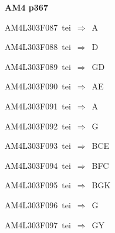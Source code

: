\par\vfill\eject
{\bf\hfill AM4 p367\hfill\hbox{}}\par\bigskip
{\sixrm AM4L303F087\ {\sixit tei}\ }$\Rightarrow$\ A\par\smallskip
{\sixrm AM4L303F088\ {\sixit tei}\ }$\Rightarrow$\ D\par\smallskip
{\sixrm AM4L303F089\ {\sixit tei}\ }$\Rightarrow$\ GD\par\smallskip
{\sixrm AM4L303F090\ {\sixit tei}\ }$\Rightarrow$\ AE\par\smallskip
{\sixrm AM4L303F091\ {\sixit tei}\ }$\Rightarrow$\ A\par\smallskip
{\sixrm AM4L303F092\ {\sixit tei}\ }$\Rightarrow$\ G\par\smallskip
{\sixrm AM4L303F093\ {\sixit tei}\ }$\Rightarrow$\ BCE\par\smallskip
{\sixrm AM4L303F094\ {\sixit tei}\ }$\Rightarrow$\ BFC\par\smallskip
{\sixrm AM4L303F095\ {\sixit tei}\ }$\Rightarrow$\ BGK\par\smallskip
{\sixrm AM4L303F096\ {\sixit tei}\ }$\Rightarrow$\ G\par\smallskip
{\sixrm AM4L303F097\ {\sixit tei}\ }$\Rightarrow$\ GY\par\smallskip

